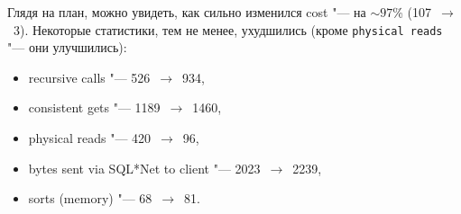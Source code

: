Глядя на план, можно увидеть, как сильно изменился cost "--- на $\sim 97$\% (107~$\to$~3).
Некоторые статистики, тем не менее, ухудшились (кроме \texttt{physical reads} "--- они улучшились):
\begin{itemize}%
  \item recursive calls "--- 526~$\to$~934,
  \item consistent gets "--- 1189~$\to$~1460,
  \item physical reads "--- 420~$\to$~96,
  \item bytes sent via SQL*Net to client "--- 2023~$\to$~2239,
  \item sorts (memory) "--- 68~$\to$~81.
\end{itemize}
